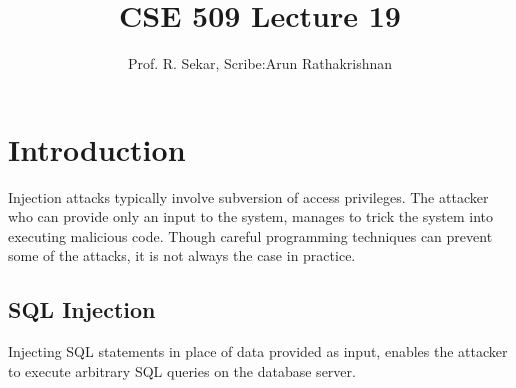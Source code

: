 \documentclass[11pt]{article} %
\title{CSE 509 Lecture 19}
\author{Prof. R. Sekar, Scribe:Arun Rathakrishnan}
\begin{document}
\maketitle
\section {Introduction}
Injection attacks typically involve subversion of access privileges. The attacker
who can provide only an input to the system, manages to trick the system into
executing malicious code. Though careful programming techniques can prevent some
of the attacks, it is not always the case in practice.
\subsection {SQL Injection}
Injecting SQL statements in place of data provided as input, enables the
attacker to execute arbitrary SQL queries on the database server.
\end{document}
